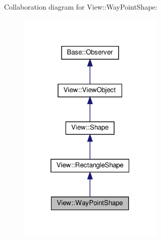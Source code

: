 Collaboration diagram for View\+:\+:Way\+Point\+Shape\+:
\nopagebreak
\begin{figure}[H]
\begin{center}
\leavevmode
\includegraphics[width=196pt]{class_view_1_1_way_point_shape__coll__graph}
\end{center}
\end{figure}
